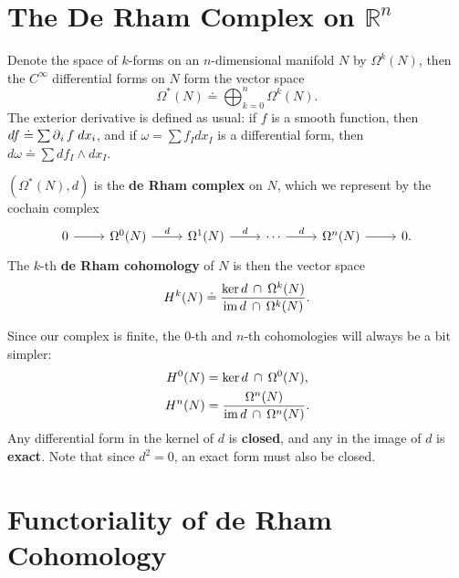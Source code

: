\documentclass[twoside,10pt]{report}
\begin{document}


\section{The De Rham Complex on \texorpdfstring{$\mathbb{R}^n$}{Rn}}

Denote the space of $k$-forms on an $n$-dimensional manifold $N$ by $\Omega^{k}(N)$, then the $C^{\infty}$ differential forms on $N$ form the vector space
\[
	\Omega^{*}(N) \doteq \bigoplus_{k=0}^{n} \Omega^{k}(N).
\] The exterior derivative is defined as usual: if $f$ is a smooth function, then $df \doteq \sum \operatorname{\partial}_{i}{f} \;dx_i$, and if $\omega = \sum f_{I}dx_{I}$ is a differential form, then $d\omega \doteq \sum df_{I} \wedge dx_{I}$.

\begin{defn}[]
$\left( \Omega^{*}(N), d \right)$ is the \textbf{de Rham complex} on $N$, which we represent by the cochain complex
\[
\begin{tikzcd}
	0\rar &\Omega^{0}(N) \rar{d}&\Omega^{1}(N)\rar{d}&\cdots\rar{d}&\Omega^{n}(N)\rar&0.
\end{tikzcd}
\] The $k$-th \textbf{de Rham cohomology} of $N$ is then the vector space
\[
	H^{k}(N) \doteq \frac{\ker d \operatorname{\;\cap\;}\Omega^{k}(N)}{\operatorname{im} d \operatorname{\;\cap\;} \Omega^{k}(N)} .
\] 
\end{defn}
Since our complex is finite, the $0$-th and $n$-th cohomologies will always be a bit simpler:
\begin{align*}
	H^{0}(N) &= \ker d \operatorname{\;\cap\;} \Omega^{0}(N),\\
	H^{n}(N) &= \frac{\Omega^{n}(N)}{\operatorname{im} d \operatorname{\;\cap\;} \Omega^{n}(N)} .
\end{align*}
Any differential form in the kernel of $d$ is \textbf{closed}, and any in the image of $d$ is \textbf{exact}. Note that since $d^{2}=0$, an exact form must also be closed.


\section{Functoriality of de Rham Cohomology}
\end{document}
